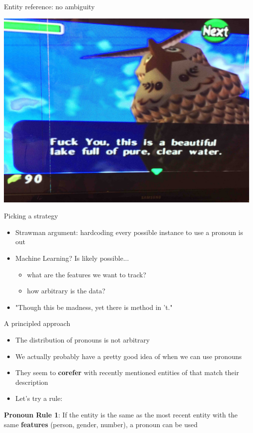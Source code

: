\documentclass[10pt, compress]{beamer}
\begin{document}
\begin{frame}{Entity reference: no ambiguity}
	\begin{center}
		\includegraphics[width=.8\textwidth]{images/zelda.jpg}
	\end{center}
\end{frame}

\begin{frame}{Picking a strategy}
	\begin{itemize}
		\item Strawman argument: hardcoding every possible instance to use a pronoun is out 	\pause
		\item Machine Learning? \pause Is likely possible...	\pause
		\begin{itemize}
			\item what are the features we want to track?
			\item how arbitrary is the data?
		\end{itemize}
		\pause
		\item "Though this be madness, yet there is method in 't."
	\end{itemize}
\end{frame}

\begin{frame}{A principled approach}
	\begin{itemize}
		\item The distribution of pronouns is not arbitrary
		\item We actually probably have a pretty good idea of when we can use pronouns \pause
		\item They seem to \textbf{corefer} with recently mentioned entities of that match their description \pause
		\item Let's try a rule:
	\end{itemize}

	\begin{exe}
		\ex \textbf{Pronoun Rule 1}: If the entity is the same as the most recent entity with the same \textbf{features} (person, gender, number), a pronoun can be used
	\end{exe}
\end{frame}
\end{document}
